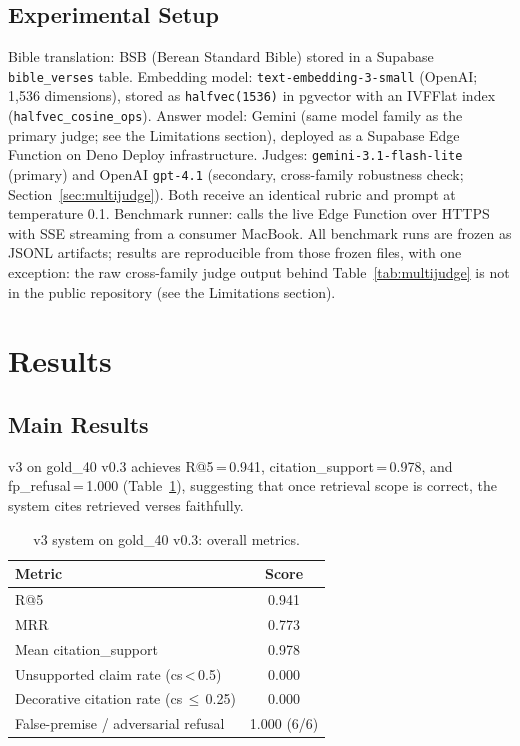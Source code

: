 \documentclass[11pt]{article}
\begin{document}
\subsection{Experimental Setup}

Bible translation: BSB (Berean Standard Bible) stored in a Supabase \texttt{bible\_verses} table.
Embedding model: \texttt{text-embedding-3-small} (OpenAI; 1,536 dimensions), stored as \texttt{halfvec(1536)} in pgvector with an IVFFlat index (\texttt{halfvec\_cosine\_ops}).
Answer model: Gemini (same model family as the primary judge; see the Limitations section), deployed as a Supabase Edge Function on Deno Deploy infrastructure.
Judges: \texttt{gemini-3.1-flash-lite} (primary) and OpenAI \texttt{gpt-4.1} (secondary, cross-family robustness check; Section~\ref{sec:multijudge}). Both receive an identical rubric and prompt at temperature 0.1.
Benchmark runner: calls the live Edge Function over HTTPS with SSE streaming from a consumer MacBook.
All benchmark runs are frozen as JSONL artifacts; results are reproducible from those frozen files, with one exception: the raw cross-family judge output behind Table~\ref{tab:multijudge} is not in the public repository (see the Limitations section).

\section{Results}

\subsection{Main Results}

v3 on gold\_40 v0.3 achieves R@5\,=\,0.941, citation\_support\,=\,0.978, and fp\_refusal\,=\,1.000 (Table~\ref{tab:main}), suggesting that once retrieval scope is correct, the system cites retrieved verses faithfully.

\begin{table}[t]
  \centering
  \small
  \begin{tabular}{lc}
    \toprule
    \textbf{Metric} & \textbf{Score} \\
    \midrule
    R@5                            & 0.941 \\
    MRR                            & 0.773 \\
    Mean citation\_support         & 0.978 \\
    Unsupported claim rate (cs\,<\,0.5)   & 0.000 \\
    Decorative citation rate (cs\,$\leq$\,0.25) & 0.000 \\
    False-premise / adversarial refusal & 1.000 (6/6) \\
    \bottomrule
  \end{tabular}
  \caption{v3 system on gold\_40 v0.3: overall metrics.}
  \label{tab:main}
\end{table}
\end{document}
